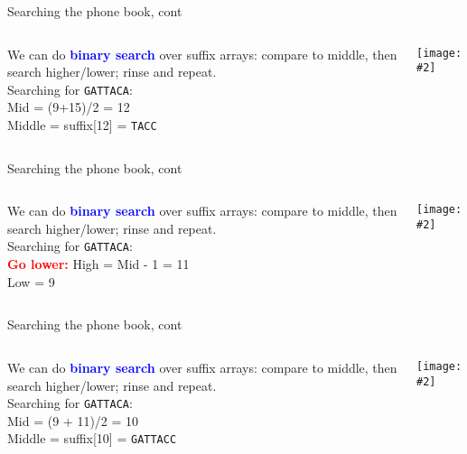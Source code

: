 \documentclass{beamer}
\renewcommand{\c}[1]{\begin{center}#1\end{center}}
\newcommand{\blu}[1]{\textcolor{blue}{\textbf{#1}}}
\newcommand{\red}[1]{\textcolor{red}{\textbf{#1}}}
\newcommand{\gr}[2][.95]{\c{\texttt{[image: \#2]}}}
\begin{document}
\begin{frame}{Searching the phone book, cont}
    \begin{columns}
        \begin{column}{0.5\textwidth}
            We can do \blu{binary search} over suffix arrays: compare to middle, then search higher/lower; rinse and repeat.\\
            \bigskip
            Searching for \texttt{GATTACA}:\\
            \bigskip
            Mid = (9+15)/2 = 12\\
            Middle = suffix[12] = \texttt{TACC}
        \end{column}
        \begin{column}{0.5\textwidth}
            \gr{l6_figs/s12_phonebook4.png}
        \end{column}
    \end{columns}
\end{frame}

\begin{frame}{Searching the phone book, cont}
    \begin{columns}
        \begin{column}{0.5\textwidth}
            We can do \blu{binary search} over suffix arrays: compare to middle, then search higher/lower; rinse and repeat.\\
            \bigskip
            Searching for \texttt{GATTACA}:\\
            \bigskip
            \red{Go lower:} High = Mid - 1 = 11\\
            Low = 9
        \end{column}
        \begin{column}{0.5\textwidth}
            \gr{l6_figs/s12_phonebook4.png}
        \end{column}
    \end{columns}
\end{frame} 

\begin{frame}{Searching the phone book, cont}
    \begin{columns}
        \begin{column}{0.5\textwidth}
            We can do \blu{binary search} over suffix arrays: compare to middle, then search higher/lower; rinse and repeat.\\
            \bigskip
            Searching for \texttt{GATTACA}:\\
            \bigskip
            Mid = (9 + 11)/2 = 10\\
            Middle = suffix[10] = \texttt{GATTACC}
        \end{column}
        \begin{column}{0.5\textwidth}
            \gr{l6_figs/s13_phonebook5.png}
        \end{column}
    \end{columns}
\end{frame} 
\end{document}
